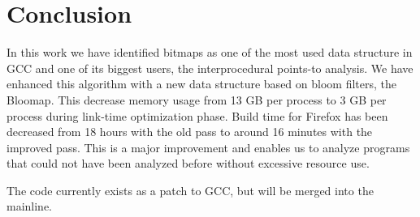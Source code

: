 \chapter*{Conclusion}

In this work we have identified bitmaps as one of the most used data
structure in GCC and one of its biggest users, the interprocedural
points-to analysis. We have enhanced this algorithm with a new data
structure based on bloom filters, the Bloomap. This decrease memory usage
from 13 GB per process to 3 GB per process during link-time optimization
phase. Build time for Firefox has been decreased from 18 hours with the
old pass to around 16 minutes with the improved pass. This is a major
improvement and enables us to analyze programs that could not have been
analyzed before without excessive resource use.

The code currently exists as a patch to GCC, but will be merged into the
mainline.
